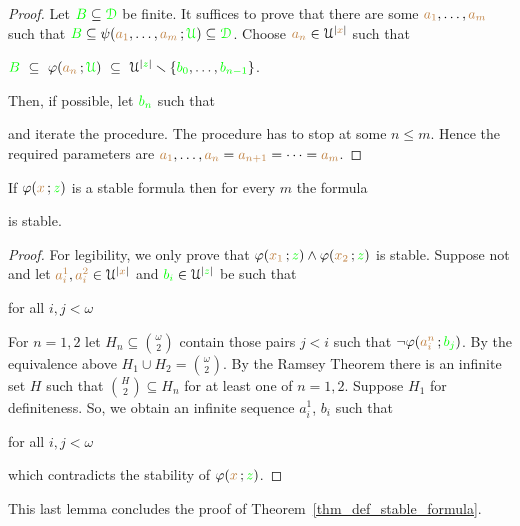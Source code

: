 \documentclass[creche.tex]{subfiles}
\begin{document}
\begin{proof}
Let ${\color{green} B}\subseteq{\color{green}\EuScript D}$ be finite.
It suffices to prove that there are some ${\color{brown} a_1},\dots,{\color{brown} a_m}$ such that ${\color{green} B}\subseteq\psi({\color{brown} a_1},\dots,{\color{brown} a_m}\,;{\color{green}\EuScript U})\subseteq{\color{green}\EuScript D}$. Choose ${\color{brown} a_n}\in\EuScript U^{|{\color{brown} x}|}$ such that 

\hfil${\color{green} B}\ \subseteq\ \varphi({\color{brown} a_n}\,;{\color{green}\EuScript U})\ \subseteq\ \EuScript U^{|{\color{green} z}|}\smallsetminus\{{\color{green} b_0},\dots,{\color{green} b_{n-1}}\}$.

Then, if possible, let ${\color{green} b_n}$ such that


and iterate the procedure.
The procedure has to stop at some $n\le m$.
Hence the required parameters are ${\color{brown} a_1},\dots,{\color{brown} a_n}={\color{brown} a_{n+1}}=\dots={\color{brown} a_{m}}$.
\end{proof}

\begin{lemma}
If $\varphi({\color{brown} x}\,;{\color{green} z})$ is a stable formula then for every $m$ the formula 


is stable.
\end{lemma}

\begin{proof}
For legibility, we only prove that $\varphi({\color{brown} x_1}\,;{\color{green} z})\wedge\varphi({\color{brown} x_2}\,;{\color{green} z})$ is stable.
Suppose not and let ${\color{brown} a^1_i},{\color{brown} a^2_i}\in\EuScript U^{|{\color{brown} x}|}$ and ${\color{green} b_i}\in\EuScript U^{|{\color{green} z}|}$ be such that 

\hfill for all $i,j<\omega$

For $n=1,2$ let $H_n\subseteq{\omega\choose 2}$ contain those pairs $j<i$ such that $\neg\varphi({\color{brown} a^n_i}\,;{\color{green} b_j})$. 
By the equivalence above $H_1\cup H_2={\omega\choose 2}$. 
By the Ramsey Theorem there is an infinite set $H$ such that ${H\choose 2}\subseteq H_n$ for at least one of $n=1,2$. Suppose $H_1$ for definiteness. So, we obtain an infinite sequence $a^1_i$, $b_i$ such that

\hfill for all $i,j<\omega$

which contradicts the stability of $\varphi({\color{brown} x}\,;{\color{green} z})$.
\end{proof}

This last lemma concludes the proof of Theorem~\ref{thm_def_stable_formula}. 
\end{document}
